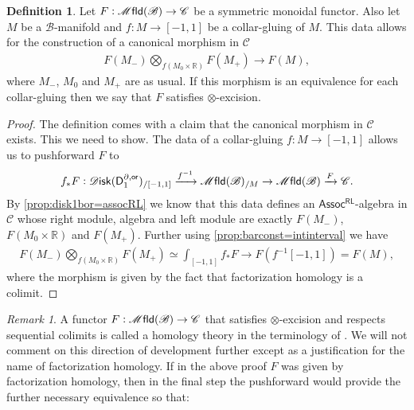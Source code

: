 \documentclass[12pt,a4paper]{article}
\newcounter{counter} \numberwithin{counter}{section}
\theoremstyle{definition}
\newtheorem{definition}[counter]{Definition}
\theoremstyle{plain}
\theoremstyle{remark}
\newtheorem{remark}[counter]{Remark}
\newcommand{\catC}{\mathscr{C}}
\newcommand{\mfld}[1][s]{%
    \ifx r#1\mathsf{Mfld}\else
    \ifx s#1\mathscr{M} \mathsf{fld}\else
    \mathrm{Illegal~option}%
    \fi\fi
}
\newcommand{\disk}{\mathscr{D} \mathsf{isk}}
\newcommand{\bstr}{\mathscr{B}}
\begin{document}
\begin{definition}
    Let $F: \mfld(\bstr) \rightarrow \catC$ be a symmetric monoidal functor. Also let $M$ be a $\bstr$-manifold and $f: M \rightarrow [-1,1]$ be a collar-gluing of $M$. This data allows for the construction of a canonical morphism in $\catC$
    \begin{align}
        F(M_-) \bigotimes\limits_{f(M_0 \times \mathbb{R})} F(M_+) \xrightarrow{\quad} F(M),
    \end{align}
    where $M_-$, $M_0$ and $M_+$ are as usual. If this morphism is an equivalence for each collar-gluing then we say that $F$ satisfies $\otimes$-excision.
\end{definition}

\begin{proof}
    The definition comes with a claim that the canonical morphism in $\catC$ exists. This we need to show. The data of a collar-gluing $f: M \rightarrow [-1,1]$ allows us to pushforward $F$ to
    \begin{align}
        f_*F: \disk (\mathsf{D}_1^{\partial, \mathsf{or}})_{/[-1,1]} \xrightarrow{f^{-1}} \mfld(\bstr)_{/M} \rightarrow \mfld(\bstr) \xrightarrow{F} \catC.
    \end{align}
    By \cref{prop:disk1bor=assocRL} we know that this data defines an $\mathsf{Assoc^{RL}}$-algebra in $\catC$ whose right module, algebra and left module are exactly $F(M_-)$, $F(M_0 \times \mathbb{R})$ and $F(M_+)$. Further using \cref{prop:barconst=intinterval} we have
    \begin{align}
        F(M_-) \bigotimes\limits_{f(M_0 \times \mathbb{R})}  F(M_+)\simeq \int_{[-1,1]} f_* F \xrightarrow{\quad} F (f^{-1}[-1,1]) = F(M),
    \end{align}
    where the morphism is given by the fact that factorization homology is a colimit.
\end{proof}


\begin{remark}
    A functor $F: \mfld(\bstr) \rightarrow \catC$ that satisfies $\otimes$-excision and respects sequential colimits is called a homology theory in the terminology of \cite{af_fhtop}. We will not comment on this direction of development further except as a justification for the name of factorization homology. If in the above proof $F$ was given by factorization homology, then in the final step the pushforward would provide the further necessary equivalence so that:
\end{remark}
\end{document}
